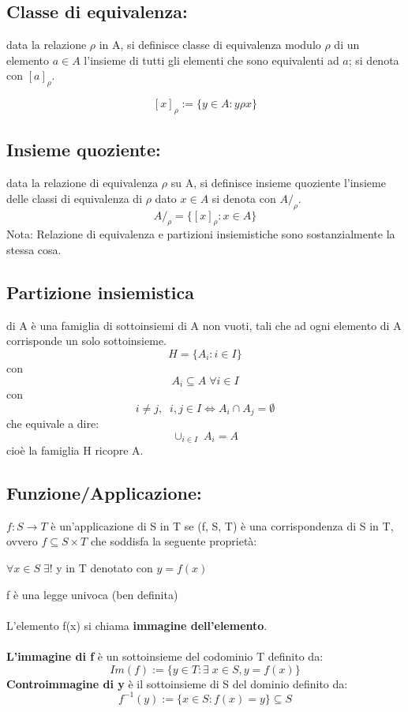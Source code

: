\subsection{Classe di equivalenza:} data la relazione \(\rho\) in A, si definisce classe di equivalenza modulo \(\rho\) di un elemento \(a \in A\) l'insieme di tutti gli elementi che sono equivalenti ad \(a\); si denota con \([a]_\rho\).

\[[x]_\rho :=\{y\in A : y\rho x\} \]

\subsection{Insieme quoziente:} data la relazione di equivalenza \(\rho\) su A, si definisce insieme quoziente l'insieme delle classi di equivalenza di \(\rho\) dato \(x\in A\) si denota con \(A/_\rho\).
\[A/_\rho = \{[x]_\rho : x \in A \} \]
\newline
Nota: Relazione di equivalenza e partizioni insiemistiche sono sostanzialmente la stessa cosa.

\subsection{Partizione insiemistica} di A è una famiglia di sottoinsiemi di A non vuoti, tali che ad ogni elemento di A corrisponde un solo sottoinsieme.
\[H = \{A_i : i \in I \} \] con \[A_i \subseteq A\; \forall i \in I\]
con
\[i \neq j,\;\; i,j \in I \Leftrightarrow A_i \cap A_j=\emptyset \]
che equivale a dire:
\[\cup_{i\in I} \; A_i = A\]
cioè la famiglia H ricopre A.

\subsection{Funzione/Applicazione:} \(f:S\rightarrow T\) è un'applicazione di S in T se (f, S, T) è una corrispondenza di S in T, ovvero \(f\subseteq S\times T\) che soddisfa la seguente proprietà:

\(\forall x \in S \; \exists !\) y in T denotato con \(y=f(x)\)

\noindent f è una legge univoca (ben definita)
\\\\
L'elemento f(x) si chiama \textbf{immagine dell'elemento}.
\\\\
\textbf{L'immagine di f} è un sottoinsieme del codominio T definito da:
\[Im(f) := \{y \in T : \exists\; x \in S, y=f(x)\}\]
\newline
\textbf{Controimmagine di y} è il sottoinsieme di S del dominio definito da:
\[f^{-1}(y):=\{x\in S:f(x)=y\}\subseteq S\]

